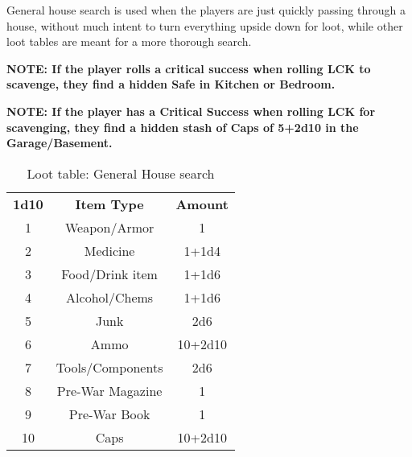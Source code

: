 \documentclass[11pt,a4paper,twocolumn]{book}
\begin{document}
    General house search is used when the players are just quickly passing through a house, without much intent to turn everything upside down for loot, while other loot tables are meant for a more thorough search.
    
    \textbf{NOTE: If the player rolls a critical success when rolling LCK to scavenge, they find a hidden Safe in Kitchen or Bedroom.}
 
    \textbf{NOTE: If the player has a Critical Success when rolling LCK for scavenging, they find a hidden stash of Caps of 5+2d10 in the Garage/Basement.} 
\begin{table}%
        \centering
        \caption{Loot table: General House search}
        \begin{tabular}{|c|c|c|}
           \hline
           \textbf{1d10}    & \textbf{Item Type}    & \textbf{Amount}  \\ 
                    1       &  Weapon/Armor         & 1           \\
                    2       &  Medicine             & 1+1d4       \\ 
                    3       &  Food/Drink item      & 1+1d6         \\  
                    4       &  Alcohol/Chems        & 1+1d6         \\     
                    5       &  Junk                 & 2d6         \\
                    6       &  Ammo                 & 10+2d10       \\     
                    7       &  Tools/Components     & 2d6           \\  
                    8       &  Pre-War Magazine     & 1         \\
                    9       &  Pre-War Book         & 1           \\
                    10      &  Caps                 & 10+2d10   \\ \hline
        \end{tabular}
        \label{tab:my_label}
    \end{table}

   
\end{document}

